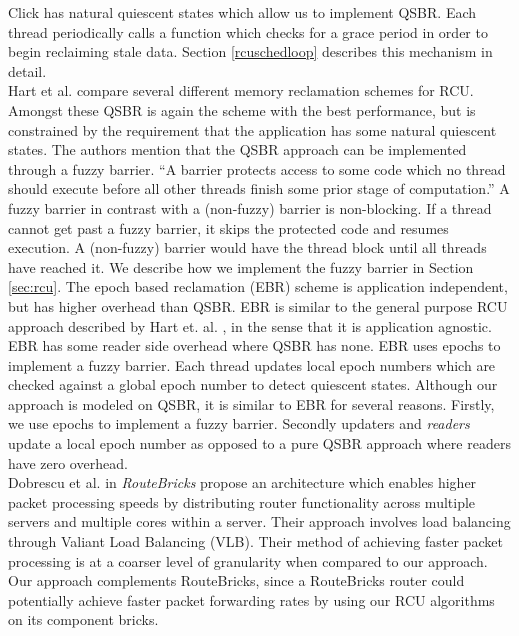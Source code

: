 \documentclass[a4paper,marginparwidth=50pt,marginparsep=10pt]{article}
\begin{document}
Click has natural quiescent states which allow us to implement QSBR. Each thread periodically calls a function which checks for a grace period in order to begin reclaiming stale data. Section \ref{rcuschedloop} describes this mechanism in detail.\\

Hart et al. \cite{hart} compare several different memory reclamation schemes for RCU. Amongst these QSBR is again the scheme with the best performance, but is constrained by the requirement that the application has some natural quiescent states. The authors mention that the QSBR approach can be implemented through a fuzzy barrier. ``A barrier protects access to some code which no thread should execute before all other threads finish some prior stage of computation.'' A fuzzy barrier in contrast with a (non-fuzzy) barrier is non-blocking. If a thread cannot get past a fuzzy barrier, it skips the protected code and resumes execution. A (non-fuzzy) barrier would have the thread block until all threads have reached it. We describe how we implement the fuzzy barrier in Section \ref{sec:rcu}. The epoch based reclamation (EBR) scheme is application independent, but has higher overhead than QSBR. EBR is similar to the general purpose RCU approach described by Hart et. al. \cite{urcu}, in the sense that it is application agnostic. EBR has some reader side overhead where QSBR has none. EBR uses epochs to implement a fuzzy barrier. Each thread updates local epoch numbers which are checked against a global epoch number to detect quiescent states. Although our approach is modeled on QSBR, it is similar to EBR for several reasons. Firstly, we use epochs to implement a fuzzy barrier. Secondly updaters and \emph{readers} update a local epoch number as opposed to a pure QSBR approach where readers have zero overhead.\\

Dobrescu et al. \cite{routebricks} in \emph{RouteBricks} propose an architecture which enables higher packet processing speeds by distributing router functionality across multiple servers and multiple cores within a server. Their approach involves load balancing through Valiant Load Balancing (VLB). Their method of achieving faster packet processing is at a coarser level of granularity when compared to our approach. Our approach complements RouteBricks, since a RouteBricks router could potentially achieve faster packet forwarding rates by using our RCU algorithms on its component bricks.\\
\end{document}
